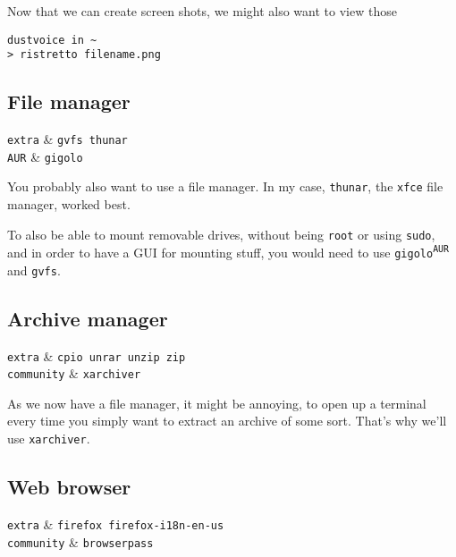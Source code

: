 \documentclass[10pt]{dustdoc}
\begin{document}
Now that we can create screen shots, we might also want to view those

\begin{verbatim}
dustvoice in ~
> ristretto filename.png
\end{verbatim}


\subsection{File manager}%
\label{sec:file-manager}

\begin{pkgtable}
    \texttt{extra} & \texttt{gvfs thunar} \\
    \texttt{AUR} & \texttt{gigolo} \\
\end{pkgtable}

You probably also want to use a file manager.
In my case, \texttt{thunar}, the \texttt{xfce} file manager, worked best.

To also be able to mount removable drives, without being \texttt{root} or using \texttt{sudo}, and in order to have a GUI for mounting stuff, you would need to use \texttt{gigolo\textsuperscript{\texttt{AUR}}} and \texttt{gvfs}.

\subsection{Archive manager}%
\label{sec:archive-manager}

\begin{pkgtable}
    \texttt{extra} & \texttt{cpio unrar unzip zip} \\
    \texttt{community} & \texttt{xarchiver} \\
\end{pkgtable}

As we now have a file manager, it might be annoying, to open up a terminal every time you simply want to extract an archive of some sort.
That’s why we’ll use \texttt{xarchiver}.

\subsection{Web browser}%
\label{sec:web-browser}

\begin{pkgtable}
    \texttt{extra} & \texttt{firefox firefox-i18n-en-us} \\
    \texttt{community} & \texttt{browserpass} \\
\end{pkgtable}
\end{document}
